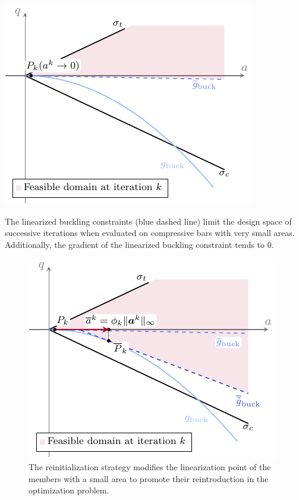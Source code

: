 \begin{marginfigure}
    \centering
    \includegraphics[width=\linewidth]{figures/04_TTO_improvements/04_SLP_tiny_area_design_space/slp_tiny_design_space.pdf}
    \caption{The linearized buckling constraints (blue dashed line) limit the design space of successive iterations when evaluated on compressive bars with very small areas. Additionally, the gradient of the linearized buckling constraint tends to 0.}
    \label{fig:04_tiny-area}
\end{marginfigure}

\begin{figure}
    \centering
    \includegraphics[width=0.7\linewidth]{figures/04_TTO_improvements/05_reinit_strategy/reinit_strat.pdf}
    \caption{The reinitialization strategy modifies the linearization point of the members with a small area to promote their reintroduction in the optimization problem.}
    \label{fig:04_reinit_strat}
\end{figure}

